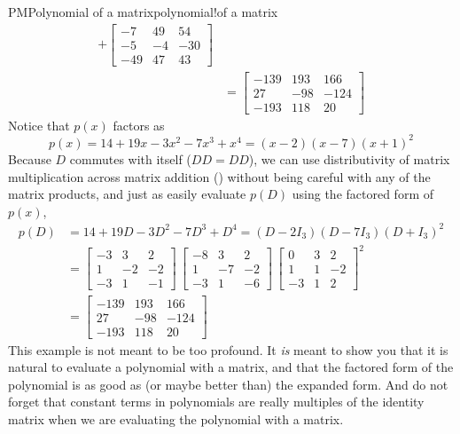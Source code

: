\begin{example}{PM}{Polynomial of a matrix}{polynomial!of a matrix}
\begin{align*}
    +\begin{bmatrix}-7 & 49 & 54\\-5 & -4 & -30\\-49 & 47 & 43\end{bmatrix}\\
&=
\begin{bmatrix}
-139 & 193 & 166\\
27 & -98 & -124\\
-193 & 118 & 20
\end{bmatrix}
\end{align*}
%
Notice that $p(x)$ factors as
%
\begin{equation*}
p(x)=14+19x-3x^2-7x^3+x^4=(x-2)(x-7)(x+1)^2
\end{equation*}
%
Because $D$ commutes with itself ($DD=DD$), we can use distributivity of matrix multiplication across matrix addition () without being careful with any of the matrix products, and just as easily evaluate $p(D)$ using the factored form of $p(x)$,
%
\begin{align*}
p(D)&=14+19D-3D^2-7D^3+D^4=(D-2I_3)(D-7I_3)(D+I_3)^2\\
&=
\begin{bmatrix}
-3 & 3 & 2\\ 1 & -2 & -2\\ -3 & 1 & -1
\end{bmatrix}\,
\begin{bmatrix}
-8 & 3 & 2\\ 1 & -7 & -2\\ -3 & 1 & -6
\end{bmatrix}\,
\begin{bmatrix}
0 & 3 & 2\\ 1 & 1 & -2\\ -3 & 1 & 2
\end{bmatrix}^2\\
&=
\begin{bmatrix}
-139 & 193 & 166\\
27 & -98 & -124\\
-193 & 118 & 20
\end{bmatrix}
%
\end{align*}
%
This example is not meant to be too profound.  It {\em is} meant to show you that it is natural to evaluate a polynomial with a matrix, and that the factored form of the polynomial is as good as (or maybe better than) the expanded form.  And do not forget that constant terms in polynomials are really multiples of the identity matrix when we are evaluating the polynomial with a matrix.
%
\end{example}

